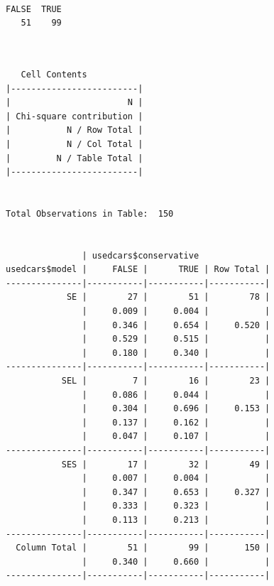 \documentclass[
  letterpaper,
  DIV=11,
  numbers=noendperiod]{scrartcl}
\newenvironment{Shaded}{\begin{snugshade}}{\end{snugshade}}
\newcommand{\AttributeTok}[1]{\textcolor[rgb]{0.40,0.45,0.13}{#1}}
\newcommand{\FunctionTok}[1]{\textcolor[rgb]{0.28,0.35,0.67}{#1}}
\newcommand{\NormalTok}[1]{\textcolor[rgb]{0.00,0.23,0.31}{#1}}
\newcommand{\SpecialCharTok}[1]{\textcolor[rgb]{0.37,0.37,0.37}{#1}}
\begin{document}
\begin{verbatim}

FALSE  TRUE 
   51    99 
\end{verbatim}

\begin{Shaded}
\end{Shaded}

\begin{verbatim}

 
   Cell Contents
|-------------------------|
|                       N |
| Chi-square contribution |
|           N / Row Total |
|           N / Col Total |
|         N / Table Total |
|-------------------------|

 
Total Observations in Table:  150 

 
               | usedcars$conservative 
usedcars$model |     FALSE |      TRUE | Row Total | 
---------------|-----------|-----------|-----------|
            SE |        27 |        51 |        78 | 
               |     0.009 |     0.004 |           | 
               |     0.346 |     0.654 |     0.520 | 
               |     0.529 |     0.515 |           | 
               |     0.180 |     0.340 |           | 
---------------|-----------|-----------|-----------|
           SEL |         7 |        16 |        23 | 
               |     0.086 |     0.044 |           | 
               |     0.304 |     0.696 |     0.153 | 
               |     0.137 |     0.162 |           | 
               |     0.047 |     0.107 |           | 
---------------|-----------|-----------|-----------|
           SES |        17 |        32 |        49 | 
               |     0.007 |     0.004 |           | 
               |     0.347 |     0.653 |     0.327 | 
               |     0.333 |     0.323 |           | 
               |     0.113 |     0.213 |           | 
---------------|-----------|-----------|-----------|
  Column Total |        51 |        99 |       150 | 
               |     0.340 |     0.660 |           | 
---------------|-----------|-----------|-----------|

 
\end{verbatim}
\end{document}
